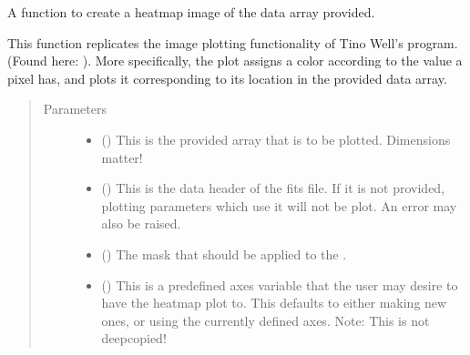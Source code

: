 \documentclass[letterpaper,10pt,english]{sphinxmanual}
\begin{document}
\begin{fulllineitems}
\label{\detokenize{docstrings/ifa_smeargle.plotting.heatmap:ifa_smeargle.plotting.heatmap.plot_heatmap}}
A function to create a heat\sphinxhyphen{}map image of the data array
provided.

This function replicates the image plotting functionality of
Tino Well’s program. (Found here:
). More specifically, the plot
assigns a color according to the value a pixel has, and plots
it corresponding to its location in the provided data array.
\begin{quote}\begin{description}
\item[{Parameters}] \leavevmode\begin{itemize}
\item {} 
 () \textendash{} This is the provided array that is to be plotted.
Dimensions matter!

\item {} 
 (\sphinxstyleliteralemphasis{\sphinxupquote{ (}}\sphinxstyleliteralemphasis{\sphinxupquote{)}}) \textendash{} This is the data header of the fits file. If it is not
provided, plotting parameters which use it will not be plot.
An error may also be raised.

\item {} 
 (\sphinxstyleliteralemphasis{\sphinxupquote{ (}}\sphinxstyleliteralemphasis{\sphinxupquote{)}}) \textendash{} The mask that should be applied to the .

\item {} 
 (\sphinxstyleliteralemphasis{\sphinxupquote{ (}}\sphinxstyleliteralemphasis{\sphinxupquote{)}}) \textendash{} This is a predefined axes variable that the user may desire
to have the heat\sphinxhyphen{}map plot to. This defaults to either making
new ones, or using the currently defined axes. Note: This
is not deep\sphinxhyphen{}copied!


\end{itemize}
\end{description}
\end{quote}
\end{fulllineitems}
\end{document}
